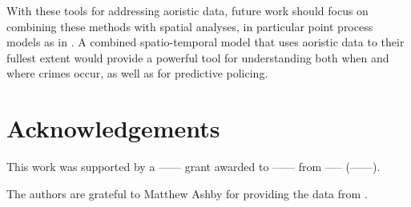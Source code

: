 With these tools for addressing aoristic data, future work should focus on combining these methods with spatial analyses, in particular point process models as in \citet{wang2014modeling}. A combined spatio-temporal model that uses aoristic data to their fullest extent would provide a powerful tool for understanding both when and where crimes occur, as well as for predictive policing.

\section{Acknowledgements}

This work was supported by a ------ grant awarded to ------ from ----- (------).

The authors are grateful to Matthew Ashby for providing the data from \citet{ashby2013comparison}.




\newpage

